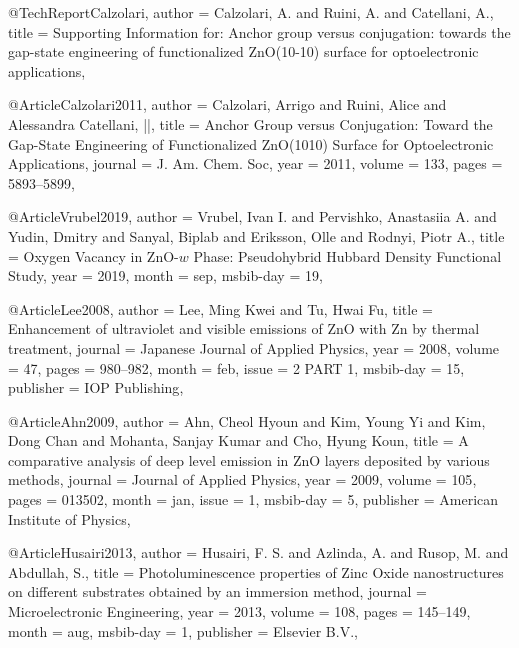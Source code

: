 @TechReport{Calzolari,
  author = {Calzolari, A. and Ruini, A. and Catellani, A.},
  title  = {Supporting Information for: Anchor group versus conjugation: towards the gap-state engineering of functionalized ZnO(10-10) surface for optoelectronic applications},
}

@Article{Calzolari2011,
  author  = {Calzolari, Arrigo and Ruini, Alice and Alessandra Catellani, ||},
  title   = {Anchor Group versus Conjugation: Toward the Gap-State Engineering of Functionalized ZnO(1010) Surface for Optoelectronic Applications},
  journal = {J. Am. Chem. Soc},
  year    = {2011},
  volume  = {133},
  pages   = {5893--5899},
}

@Article{Vrubel2019,
  author    = {Vrubel, Ivan I. and Pervishko, Anastasiia A. and Yudin, Dmitry and Sanyal, Biplab and Eriksson, Olle and Rodnyi, Piotr A.},
  title     = {Oxygen Vacancy in ZnO-$w$ Phase: Pseudohybrid Hubbard Density Functional Study},
  year      = {2019},
  month     = sep,
  msbib-day = {19},
}

@Article{Lee2008,
  author    = {Lee, Ming Kwei and Tu, Hwai Fu},
  title     = {Enhancement of ultraviolet and visible emissions of ZnO with Zn by thermal treatment},
  journal   = {Japanese Journal of Applied Physics},
  year      = {2008},
  volume    = {47},
  pages     = {980--982},
  month     = feb,
  issue     = {2 PART 1},
  msbib-day = {15},
  publisher = {IOP Publishing},
}

@Article{Ahn2009,
  author    = {Ahn, Cheol Hyoun and Kim, Young Yi and Kim, Dong Chan and Mohanta, Sanjay Kumar and Cho, Hyung Koun},
  title     = {A comparative analysis of deep level emission in ZnO layers deposited by various methods},
  journal   = {Journal of Applied Physics},
  year      = {2009},
  volume    = {105},
  pages     = {013502},
  month     = jan,
  issue     = {1},
  msbib-day = {5},
  publisher = {American Institute of Physics},
}

@Article{Husairi2013,
  author    = {Husairi, F. S. and Azlinda, A. and Rusop, M. and Abdullah, S.},
  title     = {Photoluminescence properties of Zinc Oxide nanostructures on different substrates obtained by an immersion method},
  journal   = {Microelectronic Engineering},
  year      = {2013},
  volume    = {108},
  pages     = {145--149},
  month     = aug,
  msbib-day = {1},
  publisher = {Elsevier B.V.},
}


